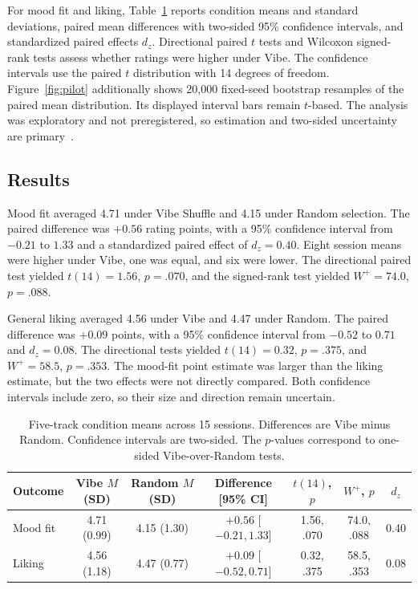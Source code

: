 For mood fit and liking, Table~\ref{tab:pilot} reports condition means and
standard deviations, paired mean differences with two-sided 95\% confidence
intervals, and standardized paired effects $d_z$. Directional paired $t$ tests
and Wilcoxon signed-rank tests assess whether ratings were higher under Vibe.
The confidence intervals use the paired $t$ distribution with 14 degrees of
freedom. Figure~\ref{fig:pilot} additionally shows 20,000 fixed-seed bootstrap
resamples of the paired mean distribution. Its displayed interval bars remain
$t$-based. The analysis was exploratory and not preregistered, so estimation
and two-sided uncertainty are primary~\cite{cumming2014,nosek2018}.

\subsection{Results}

Mood fit averaged 4.71 under Vibe Shuffle and 4.15 under Random selection. The
paired difference was $+0.56$ rating points, with a 95\% confidence interval
from $-0.21$ to $1.33$ and a standardized paired effect of $d_z=0.40$. Eight
session means were higher under Vibe, one was equal, and six were lower. The
directional paired test yielded $t(14)=1.56$, $p=.070$, and the signed-rank test
yielded $W^+=74.0$, $p=.088$.

General liking averaged 4.56 under Vibe and 4.47 under Random. The paired
difference was $+0.09$ points, with a 95\% confidence interval from $-0.52$ to
$0.71$ and $d_z=0.08$. The directional tests yielded $t(14)=0.32$, $p=.375$,
and $W^+=58.5$, $p=.353$. The mood-fit point estimate was larger than the liking
estimate, but the two effects were not directly compared. Both confidence
intervals include zero, so their size and direction remain uncertain.

\begin{table}[t]
  \caption{Five-track condition means across 15 sessions. Differences are Vibe
  minus Random. Confidence intervals are two-sided. The $p$-values correspond to
  one-sided Vibe-over-Random tests.}
  \label{tab:pilot}
  \centering
  \small
  \begin{tabular}{@{}lcccccc@{}}
    \toprule
    Outcome & Vibe $M$ (SD) & Random $M$ (SD) &
    Difference [95\% CI] & $t(14)$, $p$ & $W^+$, $p$ & $d_z$ \\
    \midrule
    Mood fit & 4.71 (0.99) & 4.15 (1.30) &
    $+0.56$ [$-0.21,1.33$] & 1.56, .070 & 74.0, .088 & 0.40 \\
    Liking & 4.56 (1.18) & 4.47 (0.77) &
    $+0.09$ [$-0.52,0.71$] & 0.32, .375 & 58.5, .353 & 0.08 \\
    \bottomrule
  \end{tabular}
\end{table}


